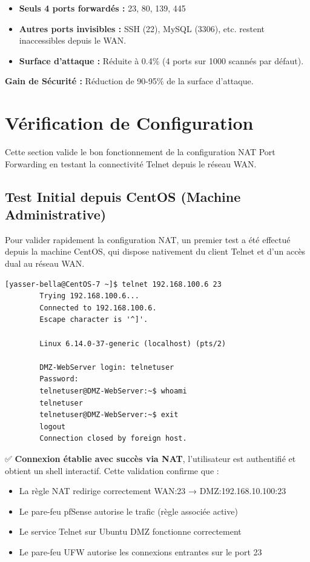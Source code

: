 \documentclass[12pt,a4paper,openany]{report}
\begin{document}
	\begin{itemize}
		\item \textbf{Seuls 4 ports forwardés :} 23, 80, 139, 445
		\item \textbf{Autres ports invisibles :} SSH (22), MySQL (3306), etc. restent inaccessibles depuis le WAN.
		\item \textbf{Surface d'attaque :} Réduite à 0.4\% (4 ports sur 1000 scannés par défaut).
	\end{itemize}
	
	\textbf{Gain de Sécurité :} Réduction de 90-95\% de la surface d'attaque.
	
	\section{Vérification de Configuration}
	
	Cette section valide le bon fonctionnement de la configuration NAT Port Forwarding 
	en testant la connectivité Telnet depuis le réseau WAN.
	
	\subsection{Test Initial depuis CentOS (Machine Administrative)}
	
	Pour valider rapidement la configuration NAT, un premier test a été effectué depuis 
	la machine CentOS, qui dispose nativement du client Telnet et d'un accès dual au 
	réseau WAN.
	
	\begin{lstlisting}[caption=Test Telnet depuis CentOS via NAT]
		[yasser-bella@CentOS-7 ~]$ telnet 192.168.100.6 23
		Trying 192.168.100.6...
		Connected to 192.168.100.6.
		Escape character is '^]'.
		
		Linux 6.14.0-37-generic (localhost) (pts/2)
		
		DMZ-WebServer login: telnetuser
		Password: 
		telnetuser@DMZ-WebServer:~$ whoami
		telnetuser
		telnetuser@DMZ-WebServer:~$ exit
		logout
		Connection closed by foreign host.
	\end{lstlisting}
	
	✅ \textbf{Connexion établie avec succès via NAT}, l'utilisateur est authentifié 
	et obtient un shell interactif. Cette validation confirme que :
	\begin{itemize}
		\item La règle NAT redirige correctement WAN:23 → DMZ:192.168.10.100:23
		\item Le pare-feu pfSense autorise le trafic (règle associée active)
		\item Le service Telnet sur Ubuntu DMZ fonctionne correctement
		\item Le pare-feu UFW autorise les connexions entrantes sur le port 23
	\end{itemize}
	
\end{document}
